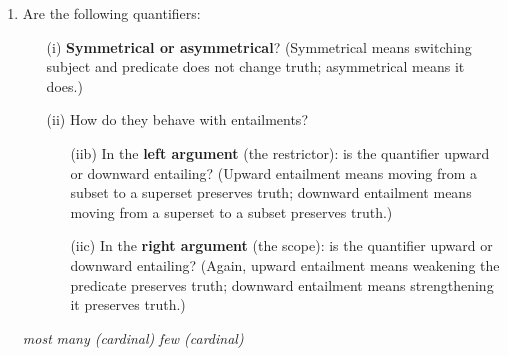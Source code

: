 \documentclass[a4paper]{article}
\begin{document}
\begin{enumerate}
\newpage
  
\item Are the following quantifiers:
  \begin{itemize}
  \item[(i)] \textbf{Symmetrical or asymmetrical}?  
  (Symmetrical means switching subject and predicate does not change truth; asymmetrical means it does.)
  \item[(ii)] How do they behave with entailments?
    \begin{itemize}
    \item[(iib)] In the \textbf{left argument} (the restrictor): is the quantifier upward or downward entailing?  
    (Upward entailment means moving from a subset to a superset preserves truth; downward entailment means moving from a superset to a subset preserves truth.)
    \item[(iic)] In the \textbf{right argument} (the scope): is the quantifier upward or downward entailing?  
    (Again, upward entailment means weakening the predicate preserves truth; downward entailment means strengthening it preserves truth.)
    \end{itemize}
  \end{itemize}
\begin{exe}
\ex \textit{most}
\ex \textit{many (cardinal)}
\ex \textit{few (cardinal)}
\end{exe}
\end{enumerate}
\end{document}
